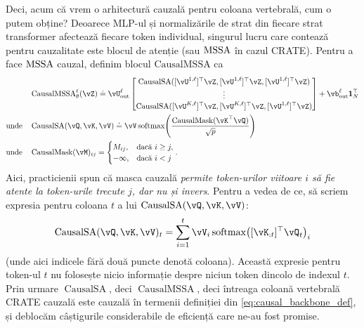 \documentclass[../../book-main_ro.tex]{subfiles}
\begin{document}
Deci, acum că vrem o arhitectură cauzală pentru coloana vertebrală, cum o putem obține? Deoarece MLP-ul și normalizările de strat din fiecare strat transformer afectează fiecare token individual, singurul lucru care contează pentru cauzalitate este blocul de atenție (sau \(\operatorname{MSSA}\) în cazul CRATE). Pentru a face \(\operatorname{MSSA}\) cauzal, definim blocul \(\mathrm{CausalMSSA}\) ca
\begin{align}
    &\operatorname{CausalMSSA}_{\theta}^{\ell}(\vZ) \doteq \vU_{\out}^{\ell}\mat{\operatorname{CausalSA}([\vU^{1, \ell}]^{\top}\vZ, [\vU^{1, \ell}]^{\top}\vZ, [\vU^{1, \ell}]^{\top}\vZ) \\ \vdots \\ \operatorname{CausalSA}([\vU^{K, \ell}]^{\top}\vZ, [\vU^{K, \ell}]^{\top}\vZ, [\vU^{1, \ell}]^{\top}\vZ)} + \vb_{\out}^{\ell}\vone_{N}^{\top} \\ 
    \text{unde} \quad & \operatorname{CausalSA}(\vQ, \vK, \vV) \doteq \vV\softmax\rp{\frac{\operatorname{CausalMask}(\vK^{\top}\vQ)}{\sqrt{p}}} \\ 
    \text{unde} \quad & \operatorname{CausalMask}(\vM)_{ij} = \casework{M_{ij}, & \text{dacă}\ i \geq j, \\ -\infty, & \text{dacă}\ i < j}.
\end{align}
Aici, practicienii spun că masca cauzală \textit{permite token-urilor viitoare \(i\) să fie atente la token-urile trecute \(j\), dar nu și invers}. Pentru a vedea de ce, să scriem expresia pentru coloana \(t\) a lui \(\operatorname{CausalSA}(\vQ, \vK, \vV)\):
\begin{equation}
    \operatorname{CausalSA}(\vQ, \vK, \vV)_{t} = \sum_{i = 1}^{t}\vV_{i}\softmax\rp{[\vK_{:t}]^{\top}\vQ_{t}}_{i}
\end{equation}
(unde aici indicele fără două puncte denotă coloana). Această expresie pentru token-ul \(t\) nu folosește nicio informație despre niciun token dincolo de indexul \(t\). Prin urmare \(\operatorname{CausalSA}\), deci \(\operatorname{CausalMSSA}\), deci întreaga coloană vertebrală CRATE cauzală este cauzală în termenii definiției din \eqref{eq:causal_backbone_def}, și deblocăm câștigurile considerabile de eficiență care ne-au fost promise.
\end{document}
